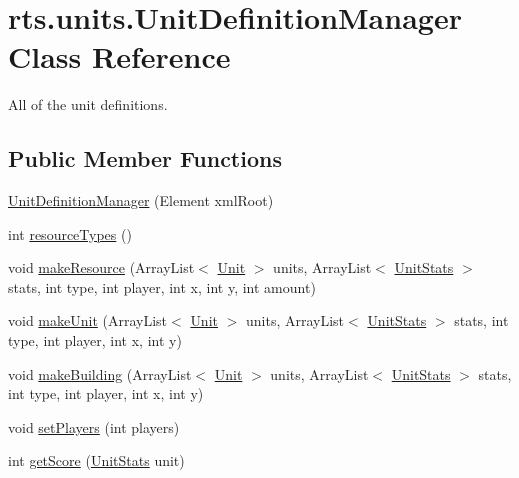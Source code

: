 \hypertarget{classrts_1_1units_1_1_unit_definition_manager}{
\section{rts.units.UnitDefinitionManager Class Reference}
\label{classrts_1_1units_1_1_unit_definition_manager}
}


All of the unit definitions.  


\subsection*{Public Member Functions}
\begin{DoxyCompactItemize}
\item 
\hyperlink{classrts_1_1units_1_1_unit_definition_manager_acccdfc7515bee0dd3bac08891e7f2b7f}{UnitDefinitionManager} (Element xmlRoot)
\item 
int \hyperlink{classrts_1_1units_1_1_unit_definition_manager_acc7891886c0641f9d7db402f86ee1788}{resourceTypes} ()
\item 
void \hyperlink{classrts_1_1units_1_1_unit_definition_manager_a8be120f925e9aee14794adf4c2c89ded}{makeResource} (ArrayList$<$ \hyperlink{classrts_1_1units_1_1_unit}{Unit} $>$ units, ArrayList$<$ \hyperlink{classrts_1_1units_1_1_unit_stats}{UnitStats} $>$ stats, int type, int player, int x, int y, int amount)
\item 
void \hyperlink{classrts_1_1units_1_1_unit_definition_manager_a9b06bbb493d10c3a33c4bd7a1e589196}{makeUnit} (ArrayList$<$ \hyperlink{classrts_1_1units_1_1_unit}{Unit} $>$ units, ArrayList$<$ \hyperlink{classrts_1_1units_1_1_unit_stats}{UnitStats} $>$ stats, int type, int player, int x, int y)
\item 
void \hyperlink{classrts_1_1units_1_1_unit_definition_manager_a029128efbe5b9bd4db17947c0d2d4789}{makeBuilding} (ArrayList$<$ \hyperlink{classrts_1_1units_1_1_unit}{Unit} $>$ units, ArrayList$<$ \hyperlink{classrts_1_1units_1_1_unit_stats}{UnitStats} $>$ stats, int type, int player, int x, int y)
\item 
void \hyperlink{classrts_1_1units_1_1_unit_definition_manager_a39ee130566fea5f92112c4f85fa17a9b}{setPlayers} (int players)
\item 
int \hyperlink{classrts_1_1units_1_1_unit_definition_manager_a6577a1875fb14f3917553f12664e4334}{getScore} (\hyperlink{classrts_1_1units_1_1_unit_stats}{UnitStats} unit)
\item 

\end{DoxyCompactItemize}
